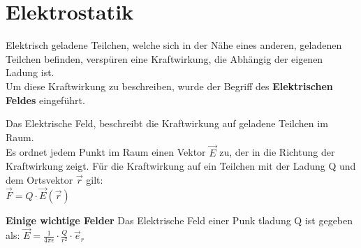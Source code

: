 %
%
%
%
%

					\section{Elektrostatik}
					\label{chap:Style}


					Elektrisch geladene Teilchen, welche sich in der Nähe eines anderen, geladenen Teilchen befinden, verspüren eine Kraftwirkung, die Abhängig der eigenen Ladung ist. \\
					Um diese Kraftwirkung zu beschreiben, wurde der Begriff des \textbf{Elektrischen Feldes} eingeführt.

					\beginip
					Das Elektrische Feld, beschreibt die Kraftwirkung auf geladene Teilchen im Raum. \\
					Es ordnet jedem Punkt im Raum einen Vektor $\vec{E}$ zu, der in die Richtung der Kraftwirkung zeigt.
					Für die Kraftwirkung auf ein Teilchen mit der Ladung Q und dem Ortsvektor $\vec{r}$ gilt: \\
					\formulaBegin
						$\vec{F} = Q \cdot \vec{E}(\vec{r})$
					\formulaEnd
					\iend


					\textbf{Einige wichtige Felder}
					\beginbsp
					Das Elektrische Feld einer Punk	tladung Q ist gegeben als:
					\formulaBegin
						$\vec{E} = \frac{1}{4 \pi \epsilon} \cdot \frac{Q}{r^2}\cdot \vec{e}_r$
					\formulaEnd
					\begin{center}
					\end{center}
					\iend




